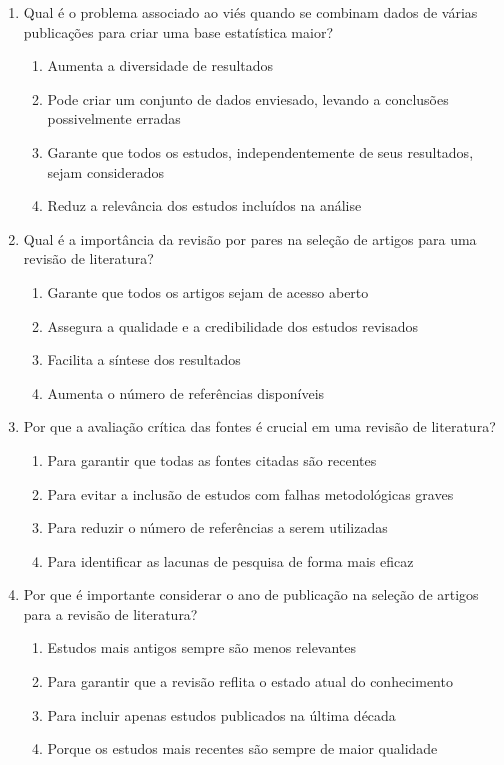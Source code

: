 \documentclass{article}
\begin{document}
\begin{enumerate}
\item Qual é o problema associado ao viés quando se combinam dados de várias publicações para criar uma base estatística maior?
\begin{enumerate}
\item  Aumenta a diversidade de resultados
\item  Pode criar um conjunto de dados enviesado, levando a conclusões possivelmente erradas
\item  Garante que todos os estudos, independentemente de seus resultados, sejam considerados
\item  Reduz a relevância dos estudos incluídos na análise
\end{enumerate}

\item Qual é a importância da revisão por pares na seleção de artigos para uma revisão de literatura?
\begin{enumerate}
    \item  Garante que todos os artigos sejam de acesso aberto
    \item  Assegura a qualidade e a credibilidade dos estudos revisados
    \item  Facilita a síntese dos resultados
    \item  Aumenta o número de referências disponíveis
\end{enumerate}

\item Por que a avaliação crítica das fontes é crucial em uma revisão de literatura?
\begin{enumerate}
    \item  Para garantir que todas as fontes citadas são recentes
    \item  Para evitar a inclusão de estudos com falhas metodológicas graves
    \item  Para reduzir o número de referências a serem utilizadas
    \item  Para identificar as lacunas de pesquisa de forma mais eficaz
\end{enumerate}

\item Por que é importante considerar o ano de publicação na seleção de artigos para a revisão de literatura?
\begin{enumerate}
    \item  Estudos mais antigos sempre são menos relevantes
    \item  Para garantir que a revisão reflita o estado atual do conhecimento
    \item  Para incluir apenas estudos publicados na última década
    \item  Porque os estudos mais recentes são sempre de maior qualidade
\end{enumerate}


\end{enumerate}
\end{document}
